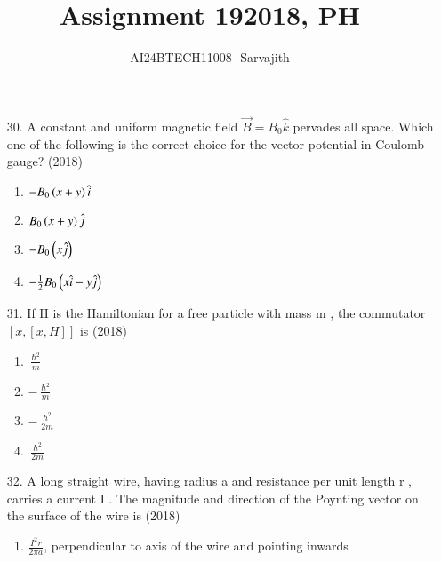 \documentclass[journal]{IEEEtran}
\begin{document}

\vspace{3cm}


\author{AI24BTECH11008- Sarvajith
}
\title{Assignment 19}
{\let\newpage\relax\maketitle}
\title{2018, PH}
\renewcommand{\thefigure}{\theenumi}
\renewcommand{\thetable}{\theenumi}
\setlength{\intextsep}{10pt} %
\renewcommand{\thetable}{\theenumi}
\begin{enumerate}
    \item[30.] A constant and uniform magnetic field $\overrightarrow{B}=B_0\hat{k}$ pervades all space. Which one of the
    following is the correct choice for the vector potential in Coulomb gauge? \hfill (2018)
    \begin{enumerate}[label = (\Alph*)]
        \item $-B_0\left(x+y\right)\hat{i}$
        \item $B_0\left(x+y\right)\hat{j}$
        \item $-B_0\left(x\hat{j}\right)$
        \item $-\frac{1}{2}B_0\left(x\hat{i}-y\hat{j}\right)$       
    \end{enumerate}
    \item[31.]If H is the Hamiltonian for a free particle with mass m , the commutator $[x,[x,H]]$ is \hfill (2018)
    \begin{enumerate}[label = (\Alph*)]
        \item $\frac{\hslash ^2}{m}$
        \item $-\frac{\hslash ^2}{m}$
        \item $-\frac{\hslash ^2}{2m}$
        \item $\frac{\hslash ^2}{2m}$
    \end{enumerate}
    \item[32.]  A long straight wire, having radius a and resistance per unit length r , carries a current
    I . The magnitude and direction of the Poynting vector on the surface of the wire is \hfill (2018)
    \begin{enumerate}[label = (\Alph*)]
        \item $\frac{I^2r}{2\pi a}$, perpendicular to axis of the wire and pointing inwards

\end{enumerate}
\end{enumerate}
\end{document}
